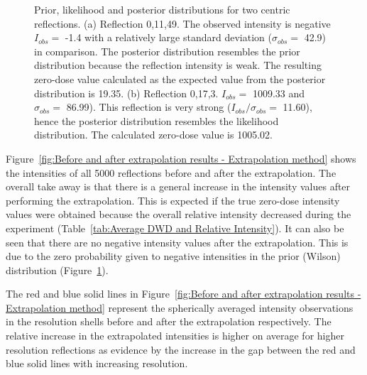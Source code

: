 \begin{figure}
\begin{subfigure}[b]{0.94\textwidth}
        \end{subfigure}
        \caption{Prior, likelihood and posterior distributions for two centric reflections.
		(a) Reflection 0,11,49. The observed intensity is negative $I_{obs} =$ -1.4 with a relatively large standard deviation ($\sigma_{obs} =$ 42.9) in comparison.
		The posterior distribution resembles the prior distribution because the reflection intensity is weak.
		The resulting zero-dose value calculated as the expected value from the posterior distribution is 19.35.
		(b) Reflection 0,17,3. $I_{obs} =$ 1009.33 and $\sigma_{obs} =$ 86.99).
		This reflection is very strong ($I_{obs}/\sigma_{obs}  =$ 11.60), hence the posterior distribution resembles the likelihood distribution.
		The calculated zero-dose value is 1005.02.}
        \label{fig:Probabilistic distributions - Extrapolation method}
\end{figure}

Figure~\ref{fig:Before and after extrapolation results - Extrapolation method}  shows the intensities of all 5000 reflections before and after the extrapolation.
The overall take away is that there is a general increase in the intensity values after performing the extrapolation.
This is expected if the true zero-dose intensity values were obtained because the overall relative intensity decreased during the experiment (Table~\ref{tab:Average DWD and Relative Intensity}).
It can also be seen that there are no negative intensity values after the extrapolation.
This is due to the zero probability given to negative intensities in the prior (Wilson) distribution (Figure~\ref{fig:Probabilistic distributions - Extrapolation method}).

The red and blue solid lines in Figure~\ref{fig:Before and after extrapolation results - Extrapolation method} represent the spherically averaged intensity observations in the resolution shells before and after the extrapolation respectively.
The relative increase in the extrapolated intensities is higher on average for higher resolution reflections as evidence by the increase in the gap between the red and blue solid lines with increasing resolution.

